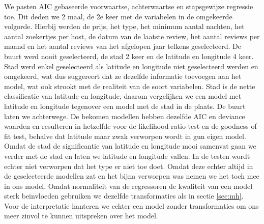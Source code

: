 \documentclass[a4paper,kulak]{kulakarticle} %
\begin{document}
We pasten AIC gebaseerde voorwaartse, achterwaartse en stapsgewijze regressie toe.
Dit deden we 2 maal, de 2e keer met de variabelen in de omgekeerde volgorde.
Hierbij werden de prijs, het type, het minimum aantal nachten, het aantal zoekertjes per host, de datum van de laatste review, het aantal reviews per maand en het aantal reviews van het afgelopen jaar telkens geselecteerd.
De buurt werd nooit geselecteerd, de stad 2 keer en de latitude en longitude 4 keer. Stad werd enkel geselecteerd als latitude en longitude niet geselecteerd werden en omgekeerd, wat dus suggereert dat ze dezelfde informatie toevoegen aan het model, wat ook strookt met de realiteit van de soort variabelen.
Stad is de nette classificatie van latitude en longitude, daarom vergelijken we een model met latitude en longitude tegenover een model met de stad in de plaats.
De buurt laten we achterwege.
De bekomen modellen hebben dezelfde AIC en deviance waarden en resulteren in hetzelfde voor de likelihood ratio test en de goodness of fit test, behalve dat latitude maar zwak verworpen wordt in gun eigen model.
Omdat de stad de significantie van latitude en longitude mooi samenvat gaan we verder met de stad en laten we latitude en longitude vallen.
In de testen wordt echter niet verworpen dat het type er niet toe doet.
Omdat deze echter altijd in de geselecteerde modellen zat en het bijna verworpen was nemen we het toch mee in ons model.
Omdat normaliteit van de regressoren de kwaliteit van een model sterk beinvloeden gebruiken we dezelfde transformaties als in sectie \ref{sec:mh}.
Voor de interpretatie hanteren we echter een model zonder transformaties om ons meer zinvol te kunnen uitspreken over het model. 
\end{document}
